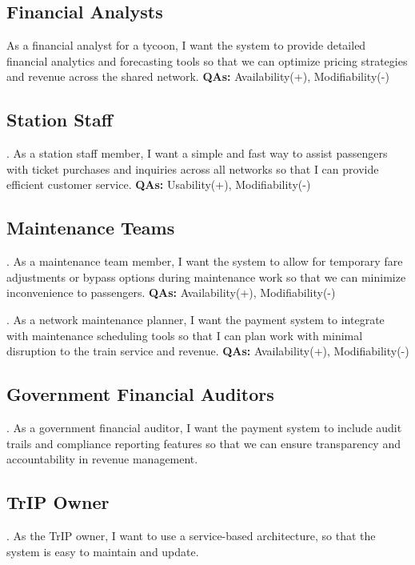\subsection{Financial Analysts}

\noindent
As a financial analyst for a tycoon, I want the system to provide detailed financial analytics and forecasting tools so that we can optimize pricing strategies and revenue across the shared network. \textbf{QAs:} Availability(+), Modifiability(-)

\subsection{Station Staff}

. As a station staff member, I want a simple and fast way to assist passengers with ticket purchases and inquiries across all networks so that I can provide efficient customer service. \textbf{QAs:} Usability(+), Modifiability(-)

\subsection{Maintenance Teams}

. As a maintenance team member, I want the system to allow for temporary fare adjustments or bypass options during maintenance work so that we can minimize inconvenience to passengers. \textbf{QAs:} Availability(+), Modifiability(-)

. As a network maintenance planner, I want the payment system to integrate with maintenance scheduling tools so that I can plan work with minimal disruption to the train service and revenue. \textbf{QAs:} Availability(+), Modifiability(-)

\subsection{Government Financial Auditors}

. As a government financial auditor, I want the payment system to include audit trails and compliance reporting features so that we can ensure transparency and accountability in revenue management.

\subsection{TrIP Owner}
. As the TrIP owner, I want to use a service-based architecture, so that the system is easy to maintain and update.

